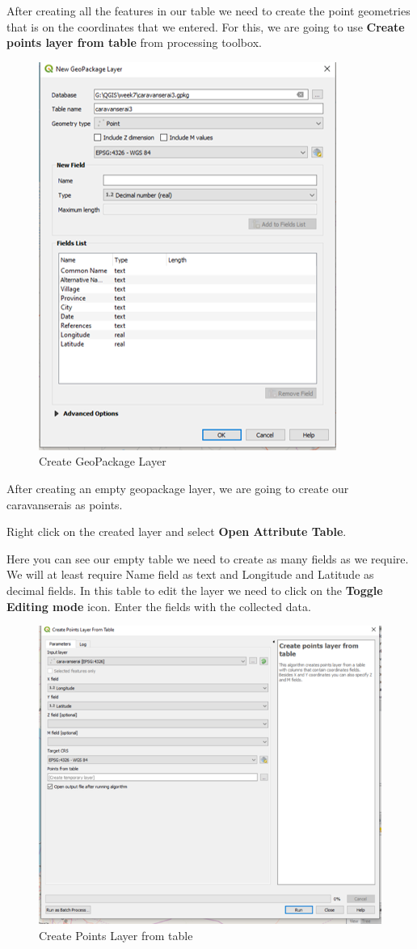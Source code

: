 \documentclass[
]{book}
\begin{document}
After creating all the features in our table we need to create the point geometries that is on the coordinates that we entered. For this, we are going to use \textbf{Create points layer from table} from processing toolbox.

\begin{figure}
\centering
\includegraphics{Images/geopackage.png}
\caption{Create GeoPackage Layer}
\end{figure}

After creating an empty geopackage layer, we are going to create our caravanserais as points.

Right click on the created layer and select \textbf{Open Attribute Table}.

Here you can see our empty table we need to create as many fields as we require. We will at least require Name field as text and Longitude and Latitude as decimal fields. In this table to edit the layer we need to click on the \textbf{Toggle Editing mode} icon. Enter the fields with the collected data.

\begin{figure}
\centering
\includegraphics{Images/createpoints.png}
\caption{Create Points Layer from table}
\end{figure}

  
\end{document}
